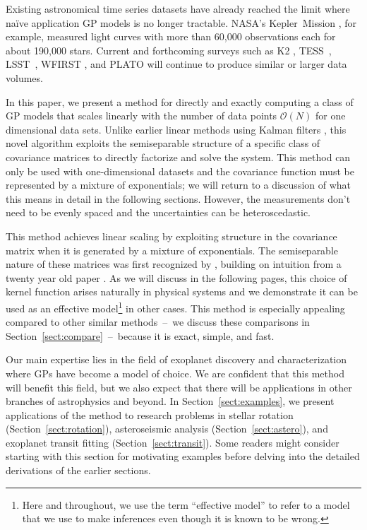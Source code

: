 \documentclass[manuscript, letterpaper]{aastex6}
\newcommand{\project}[1]{\textsf{#1}}
\newcommand{\kepler}{\project{Kepler}}
\newcommand{\lsst}{\project{LSST}}
\newcommand{\tess}{\project{TESS}}
\newcommand{\sectionname}{Section}
\newcommand{\sectref}[1]{\ref{sect:#1}}
\newcommand{\Sect}[1]{\sectionname~\sectref{#1}}
\newcommand{\sect}[1]{\Sect{#1}}
\newcommand{\response}[1]{{#1}}
\newcommand{\responseb}[1]{{#1}}
\begin{document}
\response{Existing astronomical time series datasets have already reached the
    limit where na\"ive application GP models is no longer tractable.
    NASA's \kepler\ Mission \citep{Borucki:2010}, for example, measured light
    curves with more than 60,000 observations each for about 190,000 stars.
    Current and forthcoming surveys such as \project{K2} \citep{Howell:2014},
    \tess\ \citep{Ricker:2014}, \lsst\ \citep{Ivezic:2008}, \project{WFIRST}
    \citep{Spergel:2015}, and \project{PLATO} \citep{Rauer:2014} will continue to
    produce similar or larger data volumes.}

In this paper, we present a method for directly and exactly computing a class
of GP models that scales linearly with the number of data points
$\mathcal{O}(N)$ for one dimensional data sets.
\response{Unlike earlier linear methods using Kalman filters \citep[for
        example,][]{Kelly:2014}, this novel algorithm exploits the semiseparable
    structure of a specific class of covariance matrices to directly factorize and
    solve the system.
}
This method can only be used with one-dimensional datasets and the covariance
function must be represented by a mixture of exponentials; we will return to a
discussion of what this means in detail in the following sections.
However, the measurements don't need to be evenly spaced and the uncertainties
can be heteroscedastic.

This method achieves linear scaling by exploiting structure in the covariance
matrix when it is generated by a mixture of exponentials.
\response{The semiseparable nature of these matrices was first recognized by
    \citet{Ambikasaran:2015}, building on intuition from a twenty year old paper
    \citep{Rybicki:1995}.}
As we will discuss in the following pages, this choice of kernel function
arises naturally in physical systems and we demonstrate it can be used as
an effective model\footnote{\responseb{Here and throughout, we use the term
        ``effective model'' to refer to a model that we use to make inferences even
        though it is known to be wrong.}} in other cases.
This method is especially appealing compared to other similar methods~--~we
discuss these comparisons in \sect{compare}~--~because it is exact, simple,
and fast.

Our main expertise lies in the field of exoplanet discovery and
characterization where GPs have become a model of choice.
We are confident that this method will benefit this field, but we also expect
that there will be applications in other branches of astrophysics and beyond.
In \sect{examples}, we present applications of the method to research problems
in stellar rotation (\sect{rotation}), asteroseismic analysis (\sect{astero}),
and exoplanet transit fitting (\sect{transit}).
Some readers might consider starting with this section for motivating
examples before delving into the detailed derivations of the earlier sections.
\end{document}
